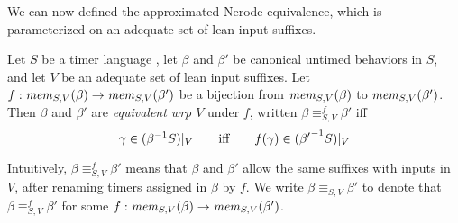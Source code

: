 




We can now defined the approximated Nerode equivalence, which is parameterized
on an adequate set of lean input suffixes.

\begin{definition}
  \label{def:approx-nerode}
Let $S$ be a timer language ,
let $\beta$ and $\beta'$ be canonical untimed behaviors in $S$,
and let  $V$ be an adequate set of lean input suffixes.
Let $f : \apprgetmemorable{S}{\beta}{V} \to \apprgetmemorable{S}{\beta'}{V}$
be a bijection
from $\apprgetmemorable{S}{\beta}{V}$ to $\apprgetmemorable{S}{\beta'}{V}$.
Then $\beta$ and $\beta'$ are \emph{equivalent wrp $V$} under $f$, written
$\beta \equiv_{S,V}^f \beta'$ iff
\[
\gamma \in \apprsuffixbehs{S}{\beta}{V}
\qquad \mbox{iff} \qquad
f(\gamma) \in \apprsuffixbehs{S}{\beta'}{V}
\]
\end{definition}
Intuitively, $\beta \equiv_{S,V}^f \beta'$ means that $\beta$ and $\beta'$
allow the same suffixes with inputs in $V$, after renaming
timers assigned in $\beta$ by $f$.
We write $\beta \equiv_{S,V} \beta'$ to denote that
$\beta \equiv_{S,V}^f \beta'$ for some
$f : \apprgetmemorable{S}{\beta}{V} \to \apprgetmemorable{S}{\beta'}{V}$.




